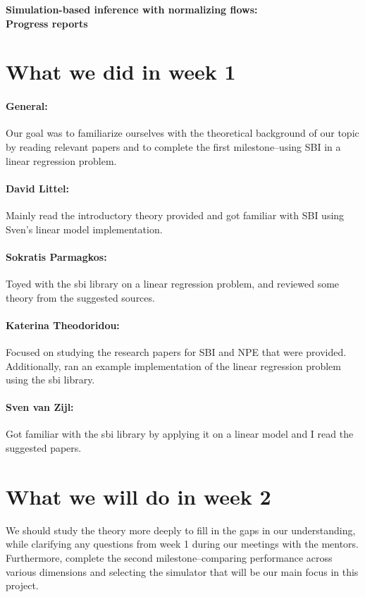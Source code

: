 \documentclass{article}
\begin{document}
\begin{center}{\Large \textbf{
    Simulation-based inference with normalizing flows:\\
    Progress reports
    }}
\end{center}

\section*{What we did in week 1}

\paragraph{General:}
Our goal was to familiarize ourselves with the theoretical background of our topic by reading relevant papers and to complete the first milestone--using SBI in a linear regression problem.
\paragraph{David Littel:}
Mainly read the introductory theory provided and got familiar with SBI using Sven's linear model implementation.

\paragraph{Sokratis Parmagkos:}
Toyed with the sbi library on a linear regression problem, and reviewed some theory from the suggested sources.

\paragraph{Katerina Theodoridou:}
Focused on studying the research papers for SBI and NPE that were provided. Additionally, ran an example implementation of the linear regression problem using the sbi library.

\paragraph{Sven van Zijl:}
Got familiar with the sbi library by applying it on a linear model and I read the suggested papers.

\section*{What we will do in week 2}
We should study the theory more deeply to fill in the gaps in our understanding, while clarifying any questions from week 1 during our meetings with the mentors. Furthermore, complete the second milestone--comparing performance across various dimensions and selecting the simulator that will be our main focus in this project.
\end{document}
